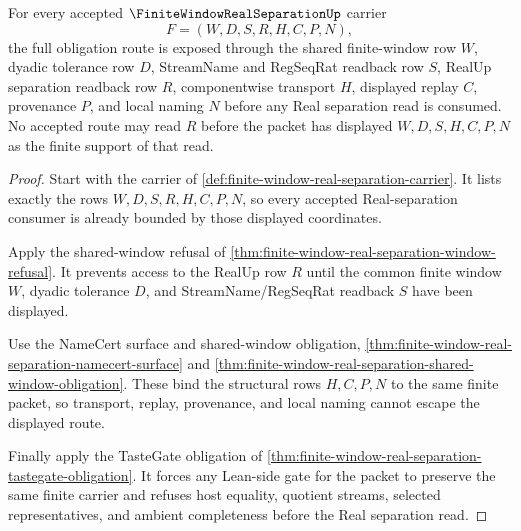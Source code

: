 \begin{theorem}
\label{thm:finite-window-real-separation-obligation-closure-route}
For every accepted $\FiniteWindowRealSeparationUp$ carrier
$$
F=(W,D,S,R,H,C,P,N),
$$
the full obligation route is exposed through the shared finite-window row $W$, dyadic tolerance row $D$, StreamName and RegSeqRat readback row $S$, RealUp separation readback row $R$, componentwise transport $H$, displayed replay $C$, provenance $P$, and local naming $N$ before any Real separation read is consumed. No accepted route may read $R$ before the packet has displayed $W,D,S,H,C,P,N$ as the finite support of that read.
\end{theorem}
\begin{proof}
Start with the carrier of \autoref{def:finite-window-real-separation-carrier}. It lists exactly the rows $W,D,S,R,H,C,P,N$, so every accepted Real-separation consumer is already bounded by those displayed coordinates.

Apply the shared-window refusal of \autoref{thm:finite-window-real-separation-window-refusal}. It prevents access to the RealUp row $R$ until the common finite window $W$, dyadic tolerance $D$, and StreamName/RegSeqRat readback $S$ have been displayed.

Use the NameCert surface and shared-window obligation, \autoref{thm:finite-window-real-separation-namecert-surface} and \autoref{thm:finite-window-real-separation-shared-window-obligation}. These bind the structural rows $H,C,P,N$ to the same finite packet, so transport, replay, provenance, and local naming cannot escape the displayed route.

Finally apply the TasteGate obligation of \autoref{thm:finite-window-real-separation-tastegate-obligation}. It forces any Lean-side gate for the packet to preserve the same finite carrier and refuses host equality, quotient streams, selected representatives, and ambient completeness before the Real separation read.
\end{proof}

